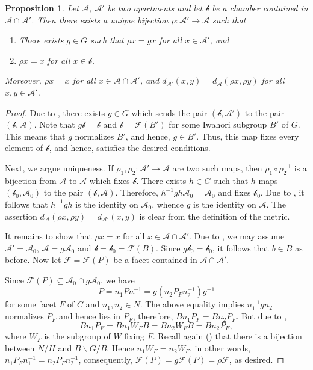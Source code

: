 \documentclass{article}
\theoremstyle{thmstyle}
\newtheorem{proposition}[theorem]{Proposition}
\theoremstyle{defstyle}
\newcommand{\scrA}{\mathscr{A}}
\newcommand{\scrb}{\mathscr{b}}
\newcommand{\scrF}{\mathscr{F}}
\begin{document}
\begin{proposition}
    Let $\scrA$, $\scrA'$ be two apartments and let $\scrb$ be a chamber contained in $\scrA\cap\scrA'$. Then there exists a unique bijection $\rho:\scrA'\to\scrA$ such that 
    \begin{enumerate}[label=(\arabic*)]
        \item There exists $g\in G$ such that $\rho x = gx$ for all $x\in\scrA'$, and 
        \item $\rho x = x$ for all $x\in\scrb$.
    \end{enumerate}
    Moreover, $\rho x = x$ for all $x\in\scrA\cap\scrA'$, and $d_{\scrA'}(x, y) = d_{\scrA}(\rho x, \rho y)$ for all $x,y\in\scrA'$.
\end{proposition}
\begin{proof}
    Due to , there exists $g\in G$ which sends the pair $(\scrb, \scrA')$ to the pair $(\scrb, \scrA)$. Note that $g\scrb = \scrb$ and $\scrb = \scrF(B')$ for some Iwahori subgroup $B'$ of $G$. This means that $g$ normalizes $B'$, and hence, $g\in B'$. Thus, this map fixes every element of $\scrb$, and hence, satisfies the desired conditions.

    Next, we argue uniqueness. If $\rho_1, \rho_2:\scrA'\to\scrA$ are two such maps, then $\rho_1\circ\rho_2^{-1}$ is a bijection from $\scrA$ to $\scrA$ which fixes $\scrb$. There exists $h\in G$ such that $h$ maps $(\scrb_0,\scrA_0)$ to the pair $(\scrb,\scrA)$. Therefore, $h^{-1}gh\scrA_0 = \scrA_0$ and fixes $\scrb_0$. Due to , it follows that $h^{-1}gh$ is the identity on $\scrA_0$, whence $g$ is the identity on $\scrA$. The assertion $d_{\scrA}(\rho x ,\rho y) = d_{\scrA'}(x, y)$ is clear from the definition of the metric.

    It remains to show that $\rho x = x$ for all $x\in\scrA\cap\scrA'$. Due to , we may assume $\scrA' = \scrA_0$, $\scrA = g\scrA_0$ and $\scrb = \scrb_0 = \scrF(B)$. Since $g\scrb_0 = \scrb_0$, it follows that $b\in B$ as before. Now let $\scrF = \scrF(P)$ be a facet contained in $\scrA\cap\scrA'$. 

    Since $\scrF(P)\subseteq\scrA_0\cap g\scrA_0$, we have 
    \begin{equation*}
        P = n_1Pn_1^{-1} = g\left(n_2P_Fn_2^{-1}\right)g^{-1}
    \end{equation*}
    for some facet $F$ of $C$ and $n_1, n_2\in N$. The above equality implies $n_1^{-1}gn_2$ normalizes $P_F$ and hence lies in $P_F$, therefore, $Bn_1P_F = Bn_2P_F$. But due to \cite[2.3.5]{macdonald-spherical-functions},
    \begin{equation*}
        Bn_1P_F = Bn_1W_FB = Bn_2W_FB = Bn_2P_F,
    \end{equation*}
    where $W_F$ is the subgroup of $W$ fixing $F$. Recall again (\cite[2.3.1]{macdonald-spherical-functions}) that there is a bijection between $N/H$ and $B\backslash G/B$. Hence $n_1W_F = n_2W_F$, in other words, $n_1P_Fn_1^{-1} = n_2P_Fn_2^{-1}$, consequently, $\scrF(P) = g\scrF(P) = \rho\scrF$, as desired.
\end{proof}
\end{document}
